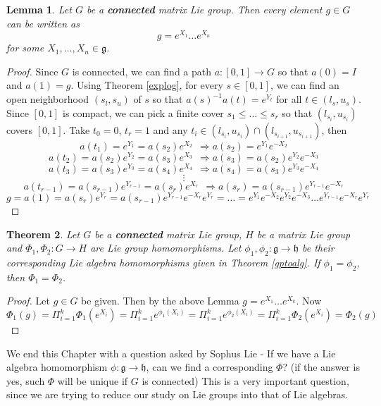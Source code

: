 \documentclass[11pt]{article}
\newtheorem{theorem}{Theorem}[section]
\newtheorem{lemma}[theorem]{Lemma}
\newcommand{\mf}[1]{\mathfrak{#1}}
\begin{document}
\begin{lemma} \label{connexp}
Let $G$ be a \textbf{connected} matrix Lie group. Then every element $g \in G$ can be written as
$$g = e^{X_1}\dots e^{X_n}$$
for some $X_1, \dots, X_n \in \mf{g}$.
\end{lemma}
\begin{proof}
Since $G$ is connected, we can find a path $a: [0,1] \to G$ so that $a(0) = I$ and $a(1) = g$. Using Theorem \ref{explog}, for every $s \in [0,1]$, we can find an open neighborhood $(s_l, s_u)$ of $s$ so that $a(s)^{-1}a(t) = e^{Y_t}$ for all $t \in (l_s, u_s)$. Since $[0,1]$ is compact, we can pick a finite cover $s_1 \leq \dots \leq s_r$ so that $(l_{s_i}, u_{s_i})$ covers $[0,1]$. Take $t_0 = 0$, $t_r = 1$ and any $t_i \in (l_{s_i}, u_{s_i}) \cap (l_{s_{i+1}}, u_{s_{i+1}})$, then
$$a(t_1) = e^{Y_1} = a(s_2)e^{X_2}\ \ \Longrightarrow  a(s_2) = e^{Y_1}e^{-X_2}$$
$$a(t_2) = a(s_2)e^{Y_2} = a(s_3)e^{X_3}\ \ \Longrightarrow  a(s_3) = a(s_2)e^{Y_2}e^{-X_3}$$
$$a(t_3) = a(s_3)e^{Y_3} = a(s_4)e^{X_4}\ \ \Longrightarrow  a(s_4) = a(s_3)e^{Y_3}e^{-X_4}$$
$$\vdots$$
$$a(t_{r-1}) = a(s_{r-1})e^{Y_{r-1}} = a(s_r)e^{X_r}\ \ \Longrightarrow  a(s_r) = a(s_{r-1})e^{Y_{r-1}}e^{-X_r}$$
$$g = a(1) = a(s_r)e^{Y_r} = a(s_{r-1})e^{Y_{r-1}}e^{-X_r}e^{Y_r} = \dots = e^{Y_1}e^{-X_2}e^{Y_2}e^{-X_3}\dots e^{Y_{r-1}}e^{-X_r}e^{Y_r}$$
\end{proof}

\begin{theorem}
Let $G$ be a \textbf{connected} matrix Lie group, $H$ be a matrix Lie group and $\Phi_1, \Phi_2: G \to H$ are Lie group homomorphisms. Let $\phi_1, \phi_2: \mf{g} \to \mf{h}$ be their corresponding Lie algebra homomorphisms given in Theorem \ref{gptoalg}. If $\phi_1 = \phi_2$, then $\Phi_1 = \Phi_2$.
\end{theorem}
\begin{proof}
Let $g \in G$ be given. Then by the above Lemma $g = e^{X_1}\dots e^{X_k}$. Now
$$\Phi_1(g) = \Pi_{i=1}^{k}\Phi_1(e^{X_i}) = \Pi_{i=1}^{k} e^{\phi_1(X_i)} = \Pi_{i=1}^{k} e^{\phi_2(X_i)} = \Pi_{i=1}^{k} \Phi_2(e^{X_i}) = \Phi_2(g)$$
\end{proof}

We end this Chapter with a question asked by Sophus Lie -
If we have a Lie algebra homomorphism $\phi: \mf{g} \to \mf{h}$, can we find a corresponding $\Phi$? (if the answer is yes, such $\Phi$ will be unique if $G$ is connected) This is a very important question, since we are trying to reduce our study on Lie groups into that of Lie algebras.\\
\end{document}
